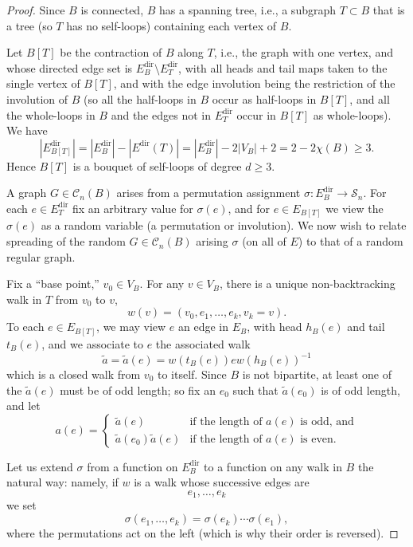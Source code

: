 \documentclass{memo-l}
\theoremstyle{plain}
\theoremstyle{definition}
\numberwithin{section}{chapter}
\numberwithin{equation}{chapter}
\newcommand{\from}{\colon}
\newcommand{\Edir}{E^{\mathrm{dir}}}
\theoremstyle{plain}
\theoremstyle{definition}
\newcommand\cC{\mathcal{C}}
\newcommand\cS{\mathcal{S}}
\begin{document}
\begin{proof}
Since $B$ is connected, $B$ has a spanning tree, i.e., a subgraph 
$T\subset B$ that is a tree (so $T$ has no self-loops) containing each
vertex of $B$.

Let $B[T]$ be the contraction of $B$ along $T$, i.e., the graph with
one vertex, and whose directed edge set is $\Edir_B\setminus \Edir_T$,
with all heads and tail maps taken to the single vertex of $B[T]$, and
with the edge involution being the restriction of the involution of $B$
(so all the half-loops in $B$ occur as half-loops in $B[T]$, and all the
whole-loops in $B$ and the edges not in $\Edir_T$ occur in $B[T]$ as
whole-loops).
We have
$$
|\Edir_{B[T]}| =
|\Edir_B| - |\Edir(T)|
=
|\Edir_B|-2|V_B|+2
=
2-2\chi(B) \ge 3.
$$
Hence $B[T]$ is a bouquet of self-loops of degree $d\ge 3$.

A graph $G\in\cC_n(B)$ arises from a permutation assignment
$\sigma\from\Edir_B\to\cS_n$.
For each $e\in \Edir_T$ fix an arbitrary value
for $\sigma(e)$, and for $e\in E_{B[T]}$
we view the $\sigma(e)$ as a random variable (a permutation or involution).
We now wish to relate spreading of the random $G\in\cC_n(B)$ arising
$\sigma$ (on all of $E$) to
that of a random regular graph.

Fix a ``base point,'' $v_0\in V_B$.
For any $v\in V_B$, there is a unique non-backtracking walk in $T$ from $v_0$
to $v$,
$$
w(v) = (v_0,e_1,\ldots,e_k,v_k=v).
$$
To each $e\in E_{B[T]}$, we may view $e$ an edge in $E_B$, with head
$h_B(e)$ and tail $t_B(e)$, and we associate to $e$ the associated
walk
$$
\tilde a=\tilde a(e) = w(t_B(e)) e w(h_B(e))^{-1} 
$$
which is a closed walk from $v_0$ to itself.
Since $B$ is not bipartite, at least one of the $\tilde a(e)$ must be of
odd length; so fix an $e_0$ such that $\tilde a(e_0)$ is of odd length,
and let
$$
a(e) = \left\{ \begin{array}{ll}
\tilde a(e) & \mbox{if the length of $a(e)$ is odd, and} \\
\tilde a(e_0)\tilde a(e) & \mbox{if the length of $a(e)$ is even.} 
\end{array} \right.
$$

Let us extend $\sigma$ from a function on $\Edir_B$ to a function
on any walk in $B$ the natural way: namely, if $w$ is a walk
whose successive edges are
$$
e_1,\ldots,e_k
$$
we set
$$
\sigma(e_1,\ldots,e_k) = \sigma(e_k)\cdots\sigma(e_1),
$$
where the permutations act on the left (which is why their order is
reversed).



\end{proof}
\end{document}
